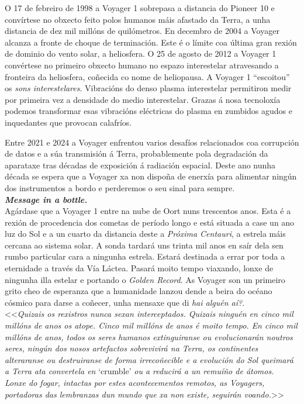 \begin{refsection}
\begin{multicols}{2}
O 17 de febreiro de 1998 a Voyager 1 sobrepasa a distancia do Pioneer 10 e
convírtese no obxecto feito polos humanos máis afastado da Terra, a unha
distancia de dez mil millóns de quilómetros. En decembro de 2004 a Voyager
alcanza a fronte de choque de terminación. Este é o límite coa última gran
rexión de dominio do vento solar, a heliosfera. O 25 de agosto de 2012 a
Voyager 1 convértese no primeiro obxecto humano no espazo interestelar
atravesando a fronteira da heliosfera, coñecida co nome de heliopausa. A
Voyager 1 ``escoitou'' os \textit{sons interestelares}. Vibracións do denso
plasma interestelar permitiron medir por primeira vez a densidade do medio
interestelar. Grazas á nosa tecnoloxía podemos transformar esas vibracións
eléctricas do plasma en zumbidos agudos e inquedantes que provocan calafríos.

Entre 2021 e 2024 a Voyager enfrentou varios desafíos relacionados coa
corrupción de datos e a súa transmisión á Terra, probablemente pola degradación
da aparataxe
tras décadas de exposición á radiación espacial. Deste ano nunha década se
espera que a Voyager xa non dispoña de enerxía para alimentar ningún dos
instrumentos a bordo e perderemos o seu sinal para sempre.\\

\textbf{\textit{Message in a bottle.}}\\
Agárdase que a Voyager 1 entre na nube de Oort nuns trescentos anos. Esta é a
rexión de procedencia dos cometas de período longo e está situada a case un ano
luz do Sol e a un cuarto da distancia deste a \textit{Próxima Centauri}, a
estrela máis cercana ao sistema solar. A sonda tardará uns trinta mil anos en
saír dela sen rumbo particular cara a ningunha estrela. Estará destinada a
errar por toda a eternidade a través da Vía Láctea. Pasará moito tempo
viaxando, lonxe de ningunha illa estelar e portando o \textit{Golden Record}.
As Voyager son un primeiro grito cheo de esperanza que a humanidade lanzou
dende a beira do océano cósmico para darse a coñecer, unha mensaxe que di
\textit{hai alguén aí?}. \\

<<\textit{Quizais os rexistros nunca sexan interceptados. Quizais ninguén en
cinco mil millóns de anos os atope. Cinco mil millóns de anos é moito tempo. En
cinco mil millóns de anos, todos os seres humanos extinguiranse ou
evolucionarán noutros seres, ningún dos nosos artefactos sobrevivirá na Terra,
os continentes alteraranse ou destruiranse de forma irrecoñecible e a evolución
do Sol queimará a Terra ata convertela en} `crumble' \textit{ou a reducirá a un
remuíño de átomos.\\ Lonxe do fogar, intactas por estes acontecementos remotos,
as Voyagers, portadoras das lembranzas dun mundo que xa non existe, seguirán
voando.}>>


\end{multicols}
\end{refsection}
